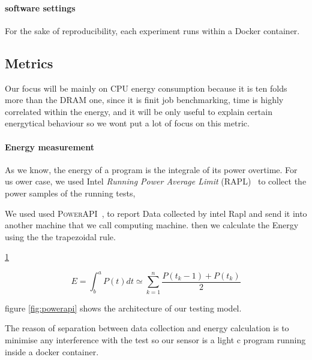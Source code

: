 \paragraph{software settings}
For the sake of reproducibility, each experiment runs within a Docker container.
\subsection{Metrics}
Our focus will be mainly on CPU energy consumption because it is ten folds more than the DRAM one, since it is finit job benchmarking, time is highly correlated within the energy, and it will be only useful to explain certain energytical behaviour so we wont put a lot of focus on this metric.



\paragraph{Energy measurement}

As we know, the energy of a program is the integrale of its power overtime. For us ower case, we used Intel \emph{Running Power Average Limit} (RAPL)~\cite{Khan:2018:RAE:3199681.3177754} to collect the power samples of the running tests,

We used used \textsc{PowerAPI}~\cite{DBLP:journals/jss/ColmantRKSFS18}, to report Data collected by intel Rapl and send it into another machine that we call computing machine. then we calculate the Energy using  the the trapezoidal rule.


\ref{fig:trapezrule}
\begin{figure}[hbt]
    \centering
    \begin{equation}
        E = \int^a_b P(t)dt \simeq \sum^n_{k=1} \frac{P(t_k-1)+P(t_k)}{2}
    \end{equation}
    \caption{}
    \label{fig:trapezrule}
\end{figure}



figure \ref{fig:powerapi} shows the architecture of our testing model.


The reason of separation between data collection and energy calculation is to minimise any interference with the test so our sensor is a light c program running inside a docker container.

